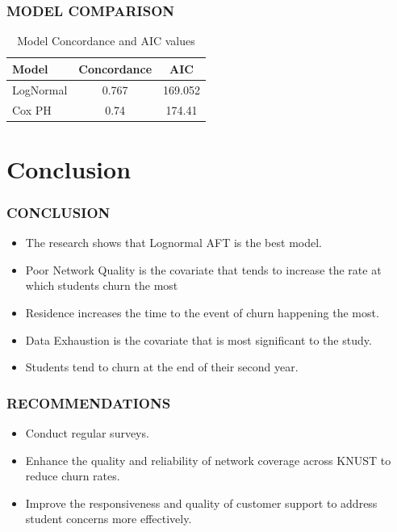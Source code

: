\documentclass{beamer}
\begin{document}
	\begin{frame}
		\frametitle{MODEL COMPARISON}
		\begin{table}[H]
			\centering
			\begin{tabular}{lcc}
				\toprule
				\textbf{Model} & \textbf{Concordance} & \textbf{AIC} \\
				\midrule
				LogNormal& 0.767& 169.052\\
				Cox PH & 0.74& 174.41\\
				\bottomrule
			\end{tabular}
			\caption{Model Concordance and AIC values}
			\label{Table 2}
			
		\end{table}
		
	\end{frame}
	
	\section{Conclusion}
	
	\begin{frame}
		\frametitle{CONCLUSION}
		\begin{itemize}
			\item The research shows that Lognormal AFT is the best model.
			\item Poor Network Quality is the covariate that tends to increase the rate at which students churn the most 
   \item  Residence increases the time to the event of churn happening the most.
   \item Data Exhaustion is the covariate that is most significant to the study.
			\item Students tend to churn at the end of their second year.
		\end{itemize}
	\end{frame}
 
	
	\begin{frame}
		\frametitle{RECOMMENDATIONS}
		\begin{itemize}
			\item Conduct regular surveys.
			\item Enhance the quality and reliability of network coverage across KNUST to reduce churn rates.
			\item Improve the responsiveness and quality of customer support to address student concerns more effectively.

			
		\end{itemize}
	\end{frame}
 
	
	\begin{frame}
		\centering{ THANK YOU}
		
		
		
	\end{frame}
	
\end{document}
